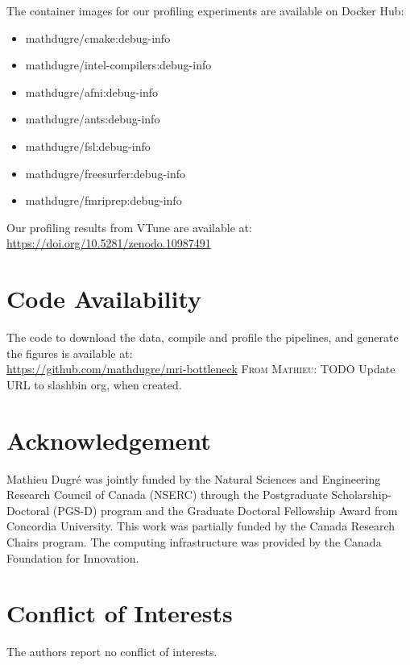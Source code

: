 \documentclass[conference]{IEEEtran}
\newcommand{\MD}[1]{\color{magenta}\textsc{From Mathieu: }#1\color{black}}
\begin{document}
The container images for our profiling experiments are available on Docker Hub:
\begin{itemize}
	\item mathdugre/cmake:debug-info
	\item mathdugre/intel-compilers:debug-info
	\item mathdugre/afni:debug-info
	\item mathdugre/ants:debug-info
	\item mathdugre/fsl:debug-info
	\item mathdugre/freesurfer:debug-info
	\item mathdugre/fmriprep:debug-info
\end{itemize}
	
Our profiling results from VTune are available at:
\\\href{https://doi.org/10.5281/zenodo.10987491}{https://doi.org/10.5281/zenodo.10987491}

\section{Code Availability}
\label{sec:code-availability}
The code to download the data, compile and profile the pipelines, and generate the figures is available at:
\\\href{https://github.com/mathdugre/mri-bottleneck}{https://github.com/mathdugre/mri-bottleneck}
\MD{TODO Update URL to slashbin org, when created.}
													
\section*{Acknowledgement}
Mathieu Dugr\'e was jointly funded by the Natural Sciences and Engineering Research Council of Canada (NSERC) through the Postgraduate Scholarship-Doctoral (PGS-D) program and the Graduate Doctoral Fellowship Award from Concordia University. This work was partially funded by the Canada Research Chairs program. The computing infrastructure was provided by the Canada Foundation for Innovation. 
													
\section*{Conflict of Interests}
The authors report no conflict of interests.
													

% 

													
\end{document}

